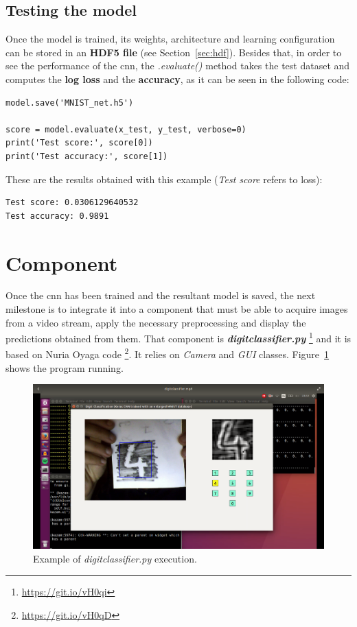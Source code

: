 \subsection{Testing the model}
Once the model is trained, its weights, architecture and learning configuration can be stored in an \textbf{HDF5 file} (see Section~\ref{sec:hdf}). Besides that, in order to see the performance of the \gls{cnn}, the \textit{.evaluate()} method takes the test dataset and computes the \textbf{log loss} and the \textbf{accuracy}, as it can be seen in the following code:
\begin{lstlisting}
model.save('MNIST_net.h5')

score = model.evaluate(x_test, y_test, verbose=0)
print('Test score:', score[0])
print('Test accuracy:', score[1])
\end{lstlisting}
These are the results obtained with this example (\textit{Test score} refers to loss):
\begin{Verbatim}[frame=single]
Test score: 0.0306129640532
Test accuracy: 0.9891
\end{Verbatim}

\section{Component}\label{sec:component}
Once the \gls{cnn} has been trained and the resultant model is saved, the next milestone is to integrate it into a component that must be able to acquire images from a video stream, apply the necessary preprocessing and display the predictions obtained from them. That component is \textbf{\textit{digitclassifier.py}} \footnote{\url{https://git.io/vH0qi}} and it is based on Nuria Oyaga code \footnote{\url{https://git.io/vH0qD}}. It relies on \textit{Camera} and \textit{GUI} classes. Figure~\ref{fig:digitclass} shows the program running.

\begin{figure}
	\centering
	\includegraphics[width=1\linewidth, keepaspectratio]{figures/digitclass.png}
	\caption{Example of \textit{digitclassifier.py} execution.}
	\label{fig:digitclass}
\end{figure}

